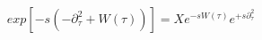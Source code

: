 \begin{equation}
exp[-s(-\partial_{\tau}^2+W(\tau))]=X e^{-s W(\tau)} 
e^{+s\partial_{\tau}^2}
\end{equation}

